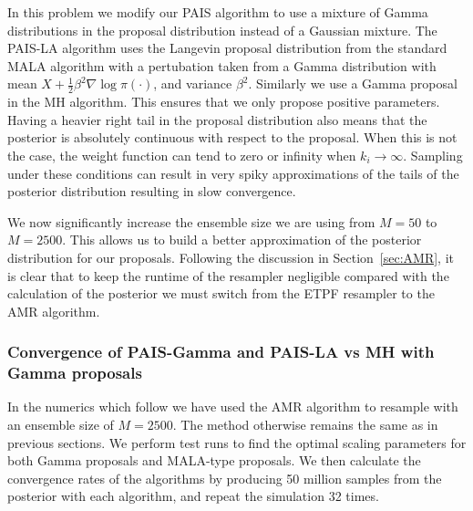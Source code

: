 \documentclass[final]{siamltex}
\begin{document}
In this problem we modify our PAIS algorithm to use a mixture of Gamma distributions in the proposal distribution instead of a Gaussian mixture. The PAIS-LA algorithm uses the Langevin proposal distribution from the standard MALA algorithm with a pertubation taken from a Gamma distribution with mean $X+\frac{1}{2}\beta^2\nabla \log\pi(\cdot)$, and  variance $\beta^2$. Similarly we use a Gamma proposal in the MH algorithm. This ensures that we only propose positive parameters. Having a heavier right tail in the proposal distribution also means that the posterior is absolutely continuous with respect to the proposal. When this is not the case, the weight function can tend to zero or infinity when $k_i \rightarrow \infty$. Sampling under these conditions can result in very spiky approximations of the tails of the posterior distribution resulting in slow convergence.

We now significantly increase the ensemble size we are using from $M=50$ to $M=2500$. This allows us to build a better approximation of the posterior distribution for our proposals. Following the discussion in Section~\ref{sec:AMR}, it is clear that to keep the runtime of the resampler negligible compared with the calculation of the posterior we must switch from the ETPF resampler to the AMR algorithm.

\subsubsection{Convergence of PAIS-Gamma and PAIS-LA vs MH with Gamma proposals}\label{sec:chem_conv}

In the numerics which follow we have used the AMR algorithm to resample with an ensemble size of $M=2500$. The method otherwise remains the same as in previous sections. We perform test runs to find the optimal scaling parameters for both Gamma proposals and MALA-type proposals. We then calculate the convergence rates of the algorithms by producing 50 million samples from the posterior with each algorithm, and repeat the simulation 32 times.
\end{document}
